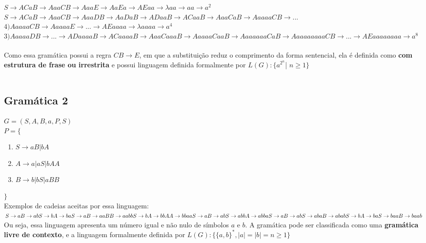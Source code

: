 \documentclass{article}
\begin{document}
$
S \rightarrow
ACaB \rightarrow
AaaCB \rightarrow
AaaE \rightarrow
AaEa \rightarrow
AEaa \rightarrow
\lambda aa \rightarrow 
aa \rightarrow a^2
$
\\

$
S \rightarrow
ACaB \rightarrow
AaaCB \rightarrow
AaaDB \rightarrow
AaDaB \rightarrow
ADaaB \rightarrow
ACaaB \rightarrow
AaaCaB \rightarrow
AaaaaCB \rightarrow ...
$
\\

$
4) AaaaaCB \rightarrow 
AaaaaE \rightarrow 
... \rightarrow 
AEaaaa \rightarrow 
\lambda aaaa \rightarrow 
a^4
$
\\

$
3)
AaaaaDB \rightarrow 
... \rightarrow 
ADaaaaB \rightarrow 
ACaaaaB \rightarrow 
AaaCaaaB \rightarrow 
AaaaaCaaB \rightarrow 
AaaaaaaCaB \rightarrow
AaaaaaaaaCB \rightarrow 
... \rightarrow 
AEaaaaaaaa \rightarrow 
a^8
$\\
\\

Como essa gramática possui a regra $CB \rightarrow E$, em que a substituição reduz o comprimento da forma sentencial, ela é definida como \textbf{com estrutura de frase ou irrestrita} e possui linguagem definida formalmente por $L(G):\{a^{2^n}$| $n\geq 1\}$\\
\\


\newpage

\subsection{Gramática 2}
$G= ( {S,A,B}, {a}, P,S )$\\
$ P = \{ $
\begin{enumerate}
    \item $S \rightarrow aB | bA$
    \item $A \rightarrow a | aS | bAA$
    \item $B \rightarrow b | bS | aBB$
\end{enumerate}
$\}$\\

Exemplos de cadeias aceitas por essa linguagem:\\
$
S \rightarrow aB \rightarrow ab\\
S \rightarrow bA \rightarrow ba\\
S \rightarrow aB \rightarrow aaBB \rightarrow aabb\\
S \rightarrow bA \rightarrow bbAA \rightarrow bbaa\\
S \rightarrow aB \rightarrow abS \rightarrow abbA \rightarrow abba\\
S \rightarrow aB \rightarrow abS \rightarrow abaB \rightarrow abab\\
S \rightarrow bA \rightarrow baS \rightarrow baaB \rightarrow baab\\
$
\\

Ou seja, essa linguagem apresenta um número igual e não nulo de símbolos $a$ e $b$. A gramática pode ser classificada como uma \textbf{gramática livre de contexto}, e a linguagem formalmente definida por $L(G): \{ \{a,b\}^{*} , |a| = |b| = n \geq 1 \}$
\end{document}
